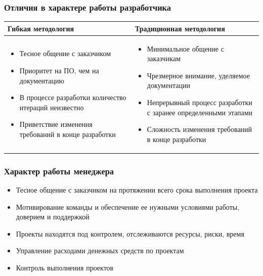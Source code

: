 \documentclass{../industrial-development}
\begin{document}
\begin{frame} \frametitle{Отличия в характере работы разработчика}

	 	\begin{table}[R]

\begin{center}
\begin{tabular}{|p{0.5\linewidth}|p{0.5\linewidth}|}
\hline
\textbf{Гибкая методология} & \textbf{Традиционная методология} \\
\hline
\begin{itemize}
\item Тесное общение с заказчиком
\item Приоритет на ПО, чем на документацию
\item В процессе разработки количество итераций неизвестно
\item Приветствие изменения требований в конце разработки
\end{itemize}
 & 
\begin{itemize}
\item Минимальное общение с заказчикам
\item Чрезмерное внимание, уделяемое документации
\item Непрерывный процесс разработки с заранее определенными этапами
\item Сложность изменения требований в конце разработки
\end{itemize} \\
\hline
\end{tabular}
\end{center}
\end{table} 
\end{frame}
\lecturenotes


\begin{frame} \frametitle{Характер работы менеджера}
\begin{itemize}
\item Тесное общение с заказчиком на протяжении всего срока выполнения проекта
\item Мотивирование команды и обеспечение ее нужными условиями работы, доверием и поддержкой
\item Проекты находятся под контролем, отслеживаются ресурсы, риски, время
\item Управление расходами денежных средств по проектам 
\item Контроль выполнения проектов
\end{itemize}
\end{frame}
\lecturenotes
\end{document}
